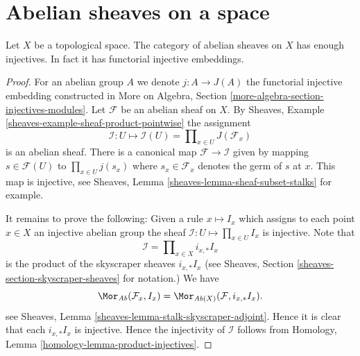 \section{Abelian sheaves on a space}
\label{section-abelian-sheaves-space}


\begin{lemma}
\label{lemma-abelian-sheaves-space}
Let $X$ be a topological space.
The category of abelian sheaves on $X$ has enough injectives.
In fact it has functorial injective embeddings.
\end{lemma}

\begin{proof}
For an abelian group $A$ we denote $j : A \to J(A)$ the functorial
injective embedding constructed in
More on Algebra, Section \ref{more-algebra-section-injectives-modules}.
Let $\mathcal{F}$ be an abelian sheaf on $X$.
By Sheaves, Example \ref{sheaves-example-sheaf-product-pointwise}
the assignment
$$
\mathcal{I} : U \mapsto
\mathcal{I}(U) = \prod\nolimits_{x\in U} J(\mathcal{F}_x)
$$
is an abelian sheaf. There is a canonical map $\mathcal{F} \to \mathcal{I}$
given by mapping $s \in \mathcal{F}(U)$ to $\prod_{x \in U} j(s_x)$
where $s_x \in \mathcal{F}_x$ denotes the germ of $s$ at $x$.
This map is injective, see
Sheaves, Lemma \ref{sheaves-lemma-sheaf-subset-stalks}
for example.

\medskip\noindent
It remains to prove the following: Given a rule
$x \mapsto I_x$ which assigns to each point $x \in X$ an injective
abelian group the sheaf $\mathcal{I} : U \mapsto \prod_{x \in U} I_x$
is injective. Note that
$$
\mathcal{I} = \prod\nolimits_{x \in X} i_{x, *}I_x
$$
is the product of the skyscraper sheaves $i_{x, *}I_x$ (see
Sheaves, Section \ref{sheaves-section-skyscraper-sheaves} for notation.)
We have
$$
\Mor_{\textit{Ab}}(\mathcal{F}_x, I_x)
=
\Mor_{\textit{Ab}(X)}(\mathcal{F}, i_{x, *}I_x).
$$
see Sheaves, Lemma \ref{sheaves-lemma-stalk-skyscraper-adjoint}. Hence it is
clear that each $i_{x, *}I_x$ is injective. Hence the injectivity of
$\mathcal{I}$ follows from
Homology, Lemma \ref{homology-lemma-product-injectives}.
\end{proof}









